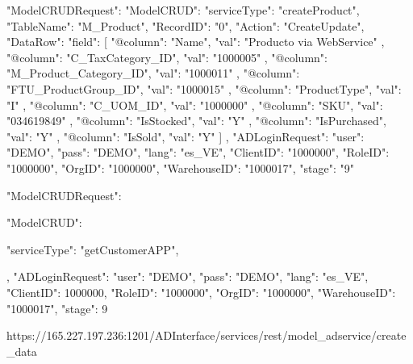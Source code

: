 {
    "ModelCRUDRequest": {
        "ModelCRUD": {
            "serviceType": "createProduct",
            "TableName": "M_Product",
            "RecordID": "0",
            "Action": "CreateUpdate",
            "DataRow": {
                "field": [
                    {
                        "@column": "Name",
                        "val": "Producto via WebService"
                    },
                    {
                        "@column": "C_TaxCategory_ID",
                        "val": "1000005"
                    },
                    {
                        "@column": "M_Product_Category_ID",
                        "val": "1000011"
                    },
                    {
                        "@column": "FTU_ProductGroup_ID",
                        "val": "1000015"
                    },
                    {
                        "@column": "ProductType",
                        "val": "I"
                    },
                    {
                        "@column": "C_UOM_ID",
                        "val": "1000000"
                    },
                    {
                        "@column": "SKU",
                        "val": "034619849"
                    },
                    {
                        "@column": "IsStocked",
                        "val": "Y"
                    },
                    {
                        "@column": "IsPurchased",
                        "val": "Y"
                    },
                    {
                        "@column": "IsSold",
                        "val": "Y"
                    }
                ]
            }
        },
        "ADLoginRequest": {
            "user": "DEMO",
            "pass": "DEMO",
            "lang": "es_VE",
            "ClientID": "1000000",
            "RoleID": "1000000",
            "OrgID": "1000000",
            "WarehouseID": "1000017",
            "stage": "9"
        }
    }
}




{
    "ModelCRUDRequest": {
        "ModelCRUD": {
            "serviceType": "getCustomerAPP",
           
        },
        "ADLoginRequest": {
            "user": "DEMO",
            "pass": "DEMO",
            "lang": "es_VE",
            "ClientID": 1000000,
            "RoleID": "1000000",
            "OrgID": "1000000",
            "WarehouseID": "1000017",
            "stage": 9
        }
    }
}


https://165.227.197.236:1201/ADInterface/services/rest/model_adservice/create_data

